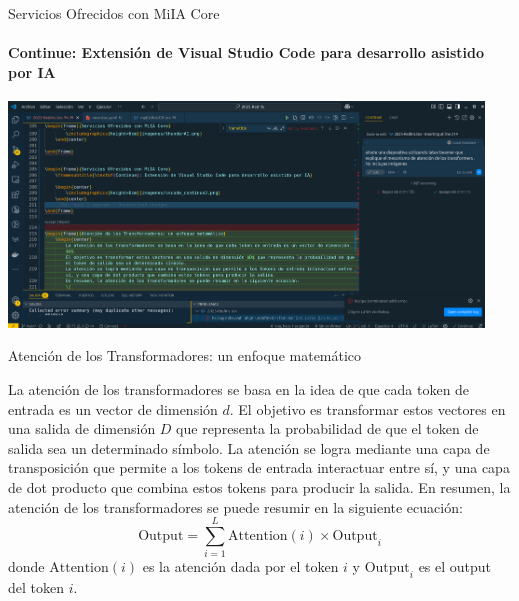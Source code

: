 \documentclass[aspectratio=169]{beamer}
\begin{document}
\begin{frame}{Servicios Ofrecidos con MiIA Core}
    \framesubtitle{\textbf{Continue}: Extensión de Visual Studio Code para desarrollo asistido por IA}

    \begin{center}
        \includegraphics[height=6cm]{imagenes/vscode_continue3.png}
    \end{center}

\end{frame}

\begin{frame}{Atención de los Transformadores: un enfoque matemático}
    \begin{center}
        La atención de los transformadores se basa en la idea de que cada token de entrada es un vector de dimensión $d$.
        El objetivo es transformar estos vectores en una salida de dimensión $D$ que representa la probabilidad de que el token de salida sea un determinado símbolo.
        La atención se logra mediante una capa de transposición que permite a los tokens de entrada interactuar entre sí, y una capa de dot producto que combina estos tokens para producir la salida.
        En resumen, la atención de los transformadores se puede resumir en la siguiente ecuación:
        \[
        \text{Output} = \sum_{i=1}^{L} \text{Attention}(i) \times \text{Output}_i
        \]
        donde $\text{Attention}(i)$ es la atención dada por el token $i$ y $\text{Output}_i$ es el output del token $i$.
    \end{center}
\end{frame}
\end{document}
